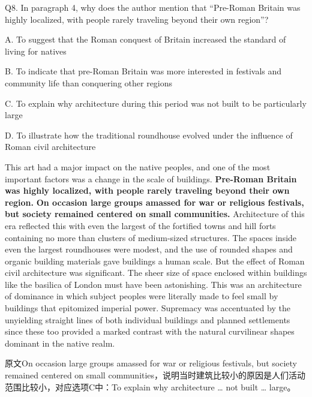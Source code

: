 \begin{blk}
    \begin{qst}
        Q8. In paragraph 4, why does the author mention that “Pre-Roman Britain was highly localized, with people rarely traveling beyond their own region”?
    \end{qst}

    \begin{chc}
        A. To suggest that the Roman conquest of Britain increased the standard of living for natives

        B. To indicate that pre-Roman Britain was more interested in festivals and community life than conquering other regions

        C. To explain why architecture during this period was not built to be particularly large

        D. To illustrate how the traditional roundhouse evolved under the influence of Roman civil architecture
    \end{chc}

    \begin{psgq}
        This art had a major impact on the native peoples, and one of the most important factors was a change in the scale of buildings. \textbf{Pre-Roman Britain was highly localized, with people rarely traveling beyond their own region.} \textbf{On occasion large groups amassed for war or religious festivals, but society remained centered on small communities.} Architecture of this era reflected this with even the largest of the fortified towns and hill forts containing no more than clusters of medium-sized structures. The spaces inside even the largest roundhouses were modest, and the use of rounded shapes and organic building materials gave buildings a human scale. But the effect of Roman civil architecture was significant. The sheer size of space enclosed within buildings like the basilica of London must have been astonishing. This was an architecture of dominance in which subject peoples were literally made to feel small by buildings that epitomized imperial power. Supremacy was accentuated by the unyielding straight lines of both individual buildings and planned settlements since these too provided a marked contrast with the natural curvilinear shapes dominant in the native realm.
    \end{psgq}

    \begin{nlz}
        原文On occasion large groups amassed for war or religious festivals, but society remained centered on small communities，说明当时建筑比较小的原因是人们活动范围比较小，对应选项C中：To explain why architecture … not built … large。
    \end{nlz}
\end{blk}

